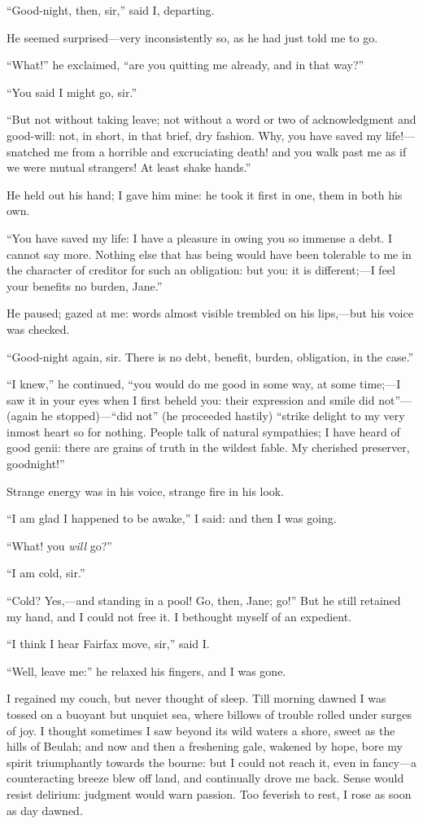 \enquote{Good-night, then, sir,} said I, departing.

He seemed surprised---very inconsistently so, as he had just told me to
go.

\enquote{What!} he exclaimed, \enquote{are you quitting me already, and
	in that way?}

\enquote{You said I might go, sir.}

\enquote{But not without taking leave; not without a word or two of
	acknowledgment and good-will: not, in short, in that brief, dry
	fashion. Why, you have saved my life!---snatched me from a horrible and
	excruciating death! and you walk past me as if we were mutual
	strangers! At least shake hands.}

He held out his hand; I gave him mine: he took it first in one, them in
both his own.

\enquote{You have saved my life: I have a pleasure in owing you so
	immense a debt. I cannot say more. Nothing else that has being would
	have been tolerable to me in the character of creditor for such an
	obligation: but you: it is different;---I feel your benefits no burden,
	Jane.}

He paused; gazed at me: words almost visible trembled on his lips,---but
his voice was checked.

\enquote{Good-night again, sir. There is no debt, benefit, burden,
	obligation, in the case.}

\enquote{I knew,} he continued, \enquote{you would do me good in some
	way, at some time;---I saw it in your eyes when I first beheld you:
	their expression and smile did not}---(again he stopped)---\enquote{did
	not} (he proceeded hastily) \enquote{strike delight to my very inmost
	heart so for nothing. People talk of natural sympathies; I have heard
	of good genii: there are grains of truth in the wildest fable. My
	cherished preserver, goodnight!}

Strange energy was in his voice, strange fire in his look.

\enquote{I am glad I happened to be awake,} I said: and then I was
going.

\enquote{What! you \emph{will} go?}

\enquote{I am cold, sir.}

\enquote{Cold? Yes,---and standing in a pool! Go, then, Jane; go!}
But he still retained my hand, and I could not free it. I bethought
myself of an expedient.

\enquote{I think I hear \Mrs{} Fairfax move, sir,} said I\@.

\enquote{Well, leave me:} he relaxed his fingers, and I was gone.

I regained my couch, but never thought of sleep. Till morning dawned I
was tossed on a buoyant but unquiet sea, where billows of trouble rolled
under surges of joy. I thought sometimes I saw beyond its wild waters a
shore, sweet as the hills of Beulah; and now and then a freshening gale,
wakened by hope, bore my spirit triumphantly towards the bourne: but I
could not reach it, even in fancy---a counteracting breeze blew off
land, and continually drove me back. Sense would resist delirium:
judgment would warn passion. Too feverish to rest, I rose as soon as
day dawned.
